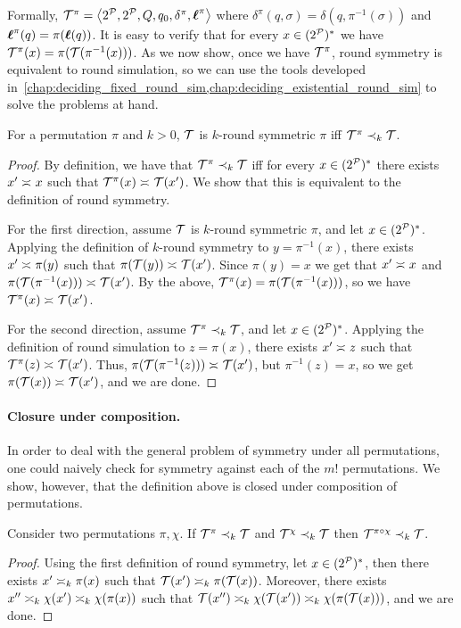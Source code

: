 Formally, $\cT^{\pi}=\tup{2^\cP,2^\cP,Q,q_0,\delta^{\pi},\lab^{\pi}}$ where $\delta^{\pi}(q,\sigma)=\delta(q,\pi^{-1}(\sigma))$ and $\lab^{\pi}(q)=\pi(\lab(q))$. It is easy to verify that for every $x\in (2^{\cP})^*$ we have $\cT^\pi(x) = \pi(\cT(\pi^{-1}(x)))$.
As we now show, once we have $\cT^\pi$, round symmetry is equivalent to round simulation, so we can use the tools developed in~\cref{chap:deciding_fixed_round_sim,chap:deciding_existential_round_sim} to solve the problems at hand.
\begin{lemma}
    \label{lem:symmetry_to_simulation}
    For a permutation $\pi$ and $k>0$, $\cT$ is $k$-round symmetric \WRT $\pi$ iff $\cT^{\pi}\prec_k \cT$.
\end{lemma}
\begin{proof}
    By definition, we have that $\cT^{\pi}\prec_{k} \cT$ iff for every $x\in (2^{\cP})^*$ there exists $x'\req x$ such that $\cT^{\pi}(x)\req \cT(x')$. We show that this is equivalent to the definition of round symmetry.
    
    For the first direction, assume $\cT$ is $k$-round symmetric \WRT $\pi$, and let $x\in (2^{\cP})^*$. Applying the definition of $k$-round symmetry to $y=\pi^{-1}(x)$, there exists $x'\req \pi(y)$ such that $\pi(\cT(y))\req \cT(x')$. Since $\pi(y)=x$ we get that $x'\req x$ and $\pi(\cT(\pi^{-1}(x)))\req \cT(x')$. By the above, $\cT^\pi(x) = \pi(\cT(\pi^{-1}(x)))$, so we have $\cT^{\pi}(x)\req \cT(x')$.
    
    For the second direction, assume $\cT^\pi \prec_k \cT$, and let $x\in (2^{\cP})^*$. Applying the definition of round simulation to $z=\pi(x)$, there exists $x'\req z$ such that $\cT^{\pi}(z)\req \cT(x')$. Thus, $\pi(\cT(\pi^{-1}(z)))\req \cT(x')$, but $\pi^{-1}(z)=x$, so we get $\pi(\cT(x))\req \cT(x')$, and we are done.
\end{proof}

\paragraph*{Closure under composition.}
In order to deal with the general problem of symmetry under all permutations, one could naively check for symmetry against each of the $m!$ permutations. We show, however, that the definition above is closed under composition of permutations. 
\begin{lemma}
    \label{lem:closure_composition}
    Consider two permutations $\pi,\chi$. If $\cT^\pi\prec_k \cT$ and $\cT^\chi \prec_k \cT$ then $\cT^{\pi\circ \chi} \prec_k \cT$.
\end{lemma}
\begin{proof}
    Using the first definition of round symmetry, let $x\in (2^{\cP})^*$, then there exists $x'\req[k] \pi(x)$ such that $\cT(x')\req[k] \pi(\cT(x))$. Moreover, there exists $x''\req[k] \chi(x') \req[k] \chi(\pi(x))$ such that $\cT(x'')\req[k] \chi(\cT(x'))\req[k] \chi(\pi(\cT(x)))$, and we are done.
\end{proof}

